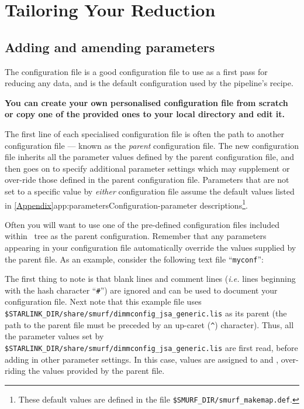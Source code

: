 \chapter{Tailoring Your Reduction}
\label{sec:tweak}


\section{Adding and amending parameters}
The configuration file  is a good
configuration file to use as a first pass for reducing any data, and is
the default configuration used by the pipeline's 
recipe.

\textbf{You can create your own personalised configuration file from
scratch or copy one of the provided ones to your local directory and
edit it.}

The first line of each specialised configuration file is often the path
to another configuration file --- known as the \emph{parent} configuration
file. The new configuration file inherits all the parameter values
defined by the parent configuration file, and then goes on to specify
additional parameter settings which may supplement or over-ride those
defined in the parent configuration file. Parameters that are not set to
a specific value by \emph{either} configuration file assume the default
values listed in \cref{Appendix}{app:parameters}{Configuration-parameter
descriptions}\footnote{These default values are defined in the file
\texttt{\$SMURF\_DIR/smurf\_makemap.def}.}.

Often you will want to use one of the pre-defined configuration files
included within \starlink\ tree as the parent configuration. Remember
that any parameters appearing in your configuration file
automatically override the values supplied by the parent file. As an
example, consider the following text file ``\texttt{myconf}'':


The first thing to note is that blank lines and comment lines
(\emph{i.e.} lines beginning with the hash character ``\texttt{\#}'') are
ignored and can be used to document your configuration file. Next note
that this example file uses
\texttt{\$STARLINK\_DIR/share/smurf/dimmconfig\_jsa\_generic.lis} as its
parent (the path to the parent file must be preceded
by an up-caret (\texttt{\^}) character). Thus, all the parameter values
set by \texttt{\$STARLINK\_DIR/share/smurf/dimmconfig\_jsa\_generic.lis} are
first read, before adding in other parameter settings. In this case, values
are assigned to  and , over-riding the
values provided by the parent file.

